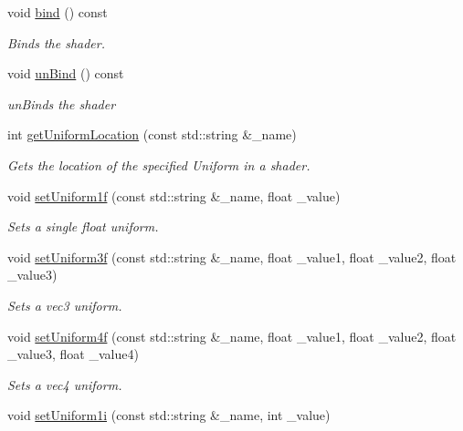 \begin{DoxyCompactItemize}
void \hyperlink{class_cookie_eng_1_1_resources_1_1_shader_program_a4824333f2e0ee0e7cfc91cb0de92e065}{bind} () const
\begin{DoxyCompactList}\small\item\em Binds the shader. \end{DoxyCompactList}\item 
void \hyperlink{class_cookie_eng_1_1_resources_1_1_shader_program_a3fad7ebcee80d0cae25dfcca62c70e63}{un\+Bind} () const
\begin{DoxyCompactList}\small\item\em un\+Binds the shader \end{DoxyCompactList}\item 
int \hyperlink{class_cookie_eng_1_1_resources_1_1_shader_program_ae2fb823b3e8da3cf7154e0a8ffe25c85}{get\+Uniform\+Location} (const std\+::string \&\+\_\+name)
\begin{DoxyCompactList}\small\item\em Gets the location of the specified Uniform in a shader. \end{DoxyCompactList}\item 
void \hyperlink{class_cookie_eng_1_1_resources_1_1_shader_program_a6029828eaecc40f6a68779b86f5baf6d}{set\+Uniform1f} (const std\+::string \&\+\_\+name, float \+\_\+value)
\begin{DoxyCompactList}\small\item\em Sets a single float uniform. \end{DoxyCompactList}\item 
void \hyperlink{class_cookie_eng_1_1_resources_1_1_shader_program_ad13eabf4105d4d484d72c16696143254}{set\+Uniform3f} (const std\+::string \&\+\_\+name, float \+\_\+value1, float \+\_\+value2, float \+\_\+value3)
\begin{DoxyCompactList}\small\item\em Sets a vec3 uniform. \end{DoxyCompactList}\item 
void \hyperlink{class_cookie_eng_1_1_resources_1_1_shader_program_a7f584c7eb32c97424d2e08e0a0c90bef}{set\+Uniform4f} (const std\+::string \&\+\_\+name, float \+\_\+value1, float \+\_\+value2, float \+\_\+value3, float \+\_\+value4)
\begin{DoxyCompactList}\small\item\em Sets a vec4 uniform. \end{DoxyCompactList}\item 
void \hyperlink{class_cookie_eng_1_1_resources_1_1_shader_program_a328b09fef2d715e25f9dc3993b060b99}{set\+Uniform1i} (const std\+::string \&\+\_\+name, int \+\_\+value)

\end{DoxyCompactItemize}
